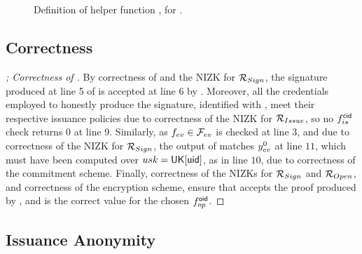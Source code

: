 \begin{figure}[ht!]
{\begin{minipage}[t]{\textwidth}
      
    \end{minipage}
  }
  \label{fig:helper-funcs}
  \caption{Definition of helper function \SimSetup, for \CUASGen.}
\end{figure}

\subsection{Correctness}

\begin{proof}[; Correctness of \CUASGen]
  By correctness of \SBCM and the NIZK for $\mathcal{R}_{Sign}$, the signature
  produced at line 5 of \ExpCorrect is accepted at line 6 by \Verify.
  Moreover, all the credentials employed to honestly produce the signature,
  identified with \scid, meet their respective issuance policies due to
  correctness of the NIZK for $\mathcal{R}_{Issue}$, so no $f_{is}^\mathsf{cid}$ check
  returns $0$ at line 9. Similarly, as $f_{ev} \in \mathcal{F}_{ev}$ is checked at
  line 3, and due to correctness of the NIZK for $\mathcal{R}_{Sign}$, the
  output of \feval matches $y_{ev}^0$ at line $11$, which must have been
  computed over $usk=\mathsf{UK}[\mathsf{uid}]$, as in line $10$, due to correctness of the
  commitment scheme. Finally, correctness of the NIZKs for $\mathcal{R}_{Sign}$
  and $\mathcal{R}_{Open}$, and correctness of the encryption scheme, ensure that
  \Judge accepts the proof produced by \Open, and \yinsp is the correct value
  for the chosen $f_{op}^{\mathsf{oid}}$.
\end{proof}

\subsection{Issuance Anonymity}

